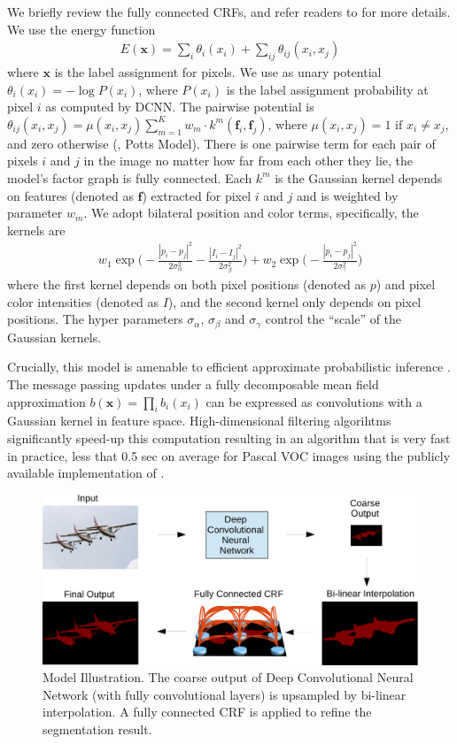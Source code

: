 We briefly review the fully connected CRFs, and refer readers to
\citep{krahenbuhl2011efficient} for more details. We use the energy function
\begin{align}
  E(\boldsymbol{x}) = \sum_i \theta_i(x_i) + \sum_{ij} \theta_{ij}(x_i, x_j)
\end{align}
where $\boldsymbol{x}$ is the label assignment for pixels. We use as unary
potential $\theta_i(x_i) = - \log P(x_i)$, where $P(x_i)$ is the label
assignment probability at pixel $i$ as computed by DCNN. The pairwise
potential is $\theta_{ij}(x_i, x_j) = \mu(x_i,x_j)\sum_{m=1}^{K} w_m \cdot
k^m(\boldsymbol{f}_i, \boldsymbol{f}_j)$, where $\mu(x_i,x_j)=1 \text{ if } x_i \neq x_j$, and zero otherwise (\ie, Potts Model). There is one pairwise term for each
pair of pixels $i$ and $j$ in the image no matter how far from each other they
lie, \ie the model's factor graph is fully connected. Each $k^m$ is the
Gaussian kernel depends on features (denoted as $\boldsymbol{f}$) extracted for pixel $i$ and $j$ and is
weighted by parameter $w_m$. We adopt bilateral position and color terms,
specifically, the kernels are
\begin{align}
  \label{eq:fully_crf}
  w_1 \exp \Big(-\frac{|p_i-p_j|^2}{2\sigma_\alpha^2} -\frac{|I_i-I_j|^2}{2\sigma_\beta^2} \Big) + w_2 \exp \Big(-\frac{|p_i-p_j|^2}{2\sigma_\gamma^2}\Big)
\end{align}
where the first kernel depends on both pixel positions (denoted as $p$) and
pixel color intensities (denoted as $I$), and the second kernel only depends
on pixel positions. The hyper parameters $\sigma_\alpha$, $\sigma_\beta$ and
$\sigma_\gamma$ control the ``scale'' of the Gaussian kernels.

Crucially, this model is amenable to efficient approximate probabilistic
inference \citep{krahenbuhl2011efficient}. The message passing updates under a
fully decomposable mean field approximation $b(\boldsymbol{x}) = \prod_i
b_i(x_i)$ can be expressed as convolutions with a Gaussian kernel in feature
space. High-dimensional filtering algorihtms \citep{adams2010fast}
significantly speed-up this computation resulting in an algorithm that is very
fast in practice, less that 0.5 sec on average for Pascal VOC images using the
publicly available implementation of \citep{krahenbuhl2011efficient}.

\begin{figure}
  \centering
  \includegraphics[width=0.7\linewidth]{fig/model_illustration2.pdf}
  \caption{Model Illustration. The coarse output of Deep Convolutional Neural
    Network (with fully convolutional layers) is upsampled by bi-linear
    interpolation. A fully connected CRF is applied to refine the segmentation
    result.}
  \label{fig:ModelIllustration}
\end{figure}

